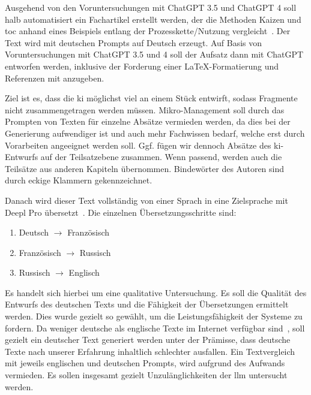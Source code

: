 
Ausgehend von den Voruntersuchungen mit ChatGPT 3.5 und ChatGPT 4 soll halb automatisiert ein Fachartikel erstellt werden,
der die Methoden Kaizen und \gls{toc} anhand eines Beispiels entlang der Prozesskette/Nutzung vergleicht~\cite{openai_chatgpt_nodate}. 
Der Text wird mit deutschen Prompts auf Deutsch erzeugt. Auf Basis von Voruntersuchungen mit ChatGPT 3.5 und 4 soll der Aufsatz dann mit ChatGPT entworfen werden, inklusive der Forderung einer \LaTeX{}-Formatierung und Referenzen mit \BibTeX{} anzugeben.

Ziel ist es, dass die \gls{ki} möglichst viel an einem Stück entwirft, sodass Fragmente nicht zusammengetragen werden müssen. Mikro-Management soll durch das Prompten von Texten für einzelne Absätze vermieden werden, da dies bei der Generierung aufwendiger ist und auch mehr Fachwissen bedarf, welche erst durch Vorarbeiten angeeignet werden soll. Ggf. fügen wir dennoch Absätze des \gls{ki}-Entwurfs auf der Teilsatzebene zusammen. Wenn passend, werden auch die Teilsätze aus anderen Kapiteln übernommen. Bindewörter des Autoren sind durch eckige Klammern gekennzeichnet.

Danach wird dieser Text vollständig von einer Sprach in eine Zielsprache mit Deepl Pro übersetzt~\cite{deepl_deepl_nodate}.
Die einzelnen Übersetzungsschritte sind:

\begin{enumerate}
	\item Deutsch $\rightarrow$ Französisch
	\item Französisch $\rightarrow$ Russisch
	\item Russisch $\rightarrow$ Englisch
\end{enumerate}

Es handelt sich hierbei um eine qualitative Untersuchung. Es soll die Qualität des Entwurfs des deutschen Texts und die Fähigkeit der Übersetzungen ermittelt werden. Dies wurde gezielt so gewählt, um die Leistungsfähigkeit der Systeme zu fordern. Da weniger deutsche als englische Texte im Internet verfügbar sind~\cite{noauthor_sprachen_nodate}, soll gezielt ein deutscher Text generiert werden unter der Prämisse, dass deutsche Texte nach unserer Erfahrung inhaltlich schlechter ausfallen. Ein Textvergleich mit jeweils englischen und deutschen Prompts, wird aufgrund des Aufwands vermieden. Es sollen insgesamt gezielt Unzulänglichkeiten der \gls{llm} untersucht werden.

